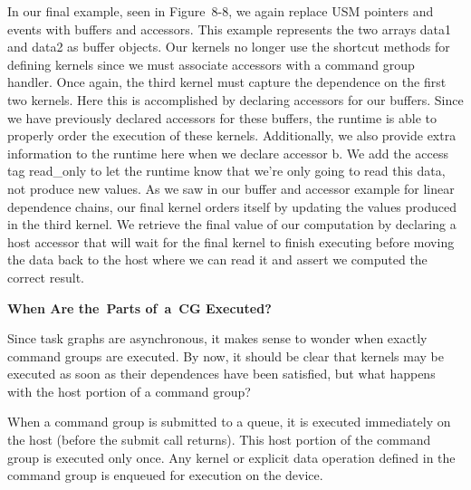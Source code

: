 In our final example, seen in Figure 8-8, we again replace USM pointers and events with buffers and accessors. This example represents the two arrays data1 and data2 as buffer objects. Our kernels no longer use the shortcut methods for defining kernels since we must associate accessors with a command group handler. Once again, the third kernel must capture the dependence on the first two kernels. Here this is accomplished by declaring accessors for our buffers. Since we have previously declared accessors for these buffers, the runtime is able to properly order the execution of these kernels. Additionally, we also provide extra information to the runtime here when we declare accessor b. We add the access tag read\_only to let the runtime know that we’re only going to read this data, not produce new values. As we saw in our buffer and accessor example for linear dependence chains, our final kernel orders itself by updating the values produced in the third kernel. We retrieve the final value of our computation by declaring a host accessor that will wait for the final kernel to finish executing before moving the data back to the host where we can read it and assert we computed the correct result.\par 

\hspace*{\fill} \par %
\textbf{When Are the Parts of a CG Executed?}

Since task graphs are asynchronous, it makes sense to wonder when exactly command groups are executed. By now, it should be clear that kernels may be executed as soon as their dependences have been satisfied, but what happens with the host portion of a command group?\par

When a command group is submitted to a queue, it is executed immediately on the host (before the submit call returns). This host portion of the command group is executed only once. Any kernel or explicit data operation defined in the command group is enqueued for execution on the device.\par

































